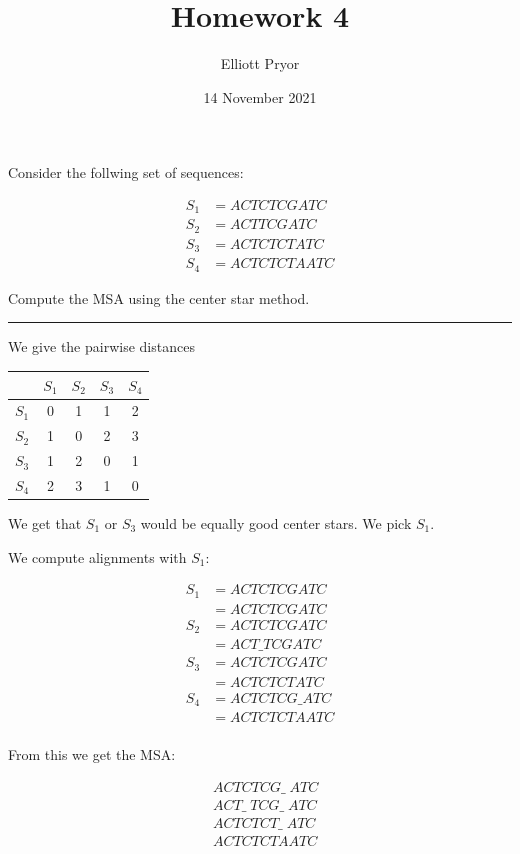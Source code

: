 \documentclass[11pt]{article}
\title{Homework 4}
\author{Elliott Pryor}
\date{14 November 2021}
\begin{document}
\maketitle

Consider the follwing set of sequences:

\begin{align*}
    S_1 &= ACTCTCGATC\\
    S_2 &= ACTTCGATC \\
    S_3 &= ACTCTCTATC \\
    S_4 &= ACTCTCTAATC
\end{align*}

Compute the MSA using the center star method.

\hrule

We give the pairwise distances

\begin{table}[H]
    \centering
    \begin{tabular}{c | c | c | c | c }
              & $S_1$ & $S_2$ & $S_3$ & $S_4$ \\ \hline
        $S_1$ &  0    &  1    &   1   & 2     \\ \hline
        $S_2$ & 1     &   0   &   2   & 3     \\ \hline
        $S_3$ &  1    &   2   &   0   & 1     \\ \hline
        $S_4$ &  2    &   3   &  1    & 0     \\ \hline
        
    \end{tabular}
\end{table}

We get that $S_1$ or $S_3$ would be equally good center stars. 
We pick $S_1$.

\begin{multicols}{2}

We compute alignments with $S_1$:

\begin{align*}
    S_1 &= ACTCTCGATC\\
     &= ACTCTCGATC \\
    S_2 &= ACTCTCGATC \\
    &= ACT\_TCGATC \\
    S_3 &= ACTCTCGATC \\
    &= ACTCTCTATC \\
    S_4 &= ACTCTCG\_ATC \\
    &= ACTCTCTAATC \\
\end{align*}

\columnbreak

From this we get the MSA:

\begin{align*}
    &ACTCTCG\_ \; ATC \\
    &ACT\_ \; TCG\_ \; ATC \\
    &ACTCTCT\_ \; ATC \\
    &ACTCTCTAATC \\
\end{align*}

\end{multicols}
\end{document}

